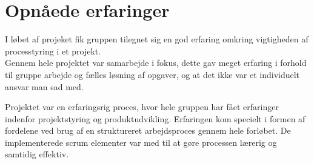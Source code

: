 \section{Opnåede erfaringer}
I løbet af projeket fik gruppen tilegnet sig en god erfaring omkring vigtigheden af processtyring i et projekt.\\
Gennem hele projektet var samarbejde i fokus, dette gav meget erfaring i forhold til gruppe arbejde og fælles løsning af opgaver, og at det ikke var et individuelt ansvar man sad med.

Projektet var en erfaringsrig proces, hvor hele gruppen har fået erfaringer indenfor projektstyring og produktudvikling. Erfaringen kom specielt i formen af fordelene ved brug af en struktureret arbejdsproces gennem hele forløbet. De implementerede scrum elementer var med til at gøre processen lærerig og samtidig effektiv.


